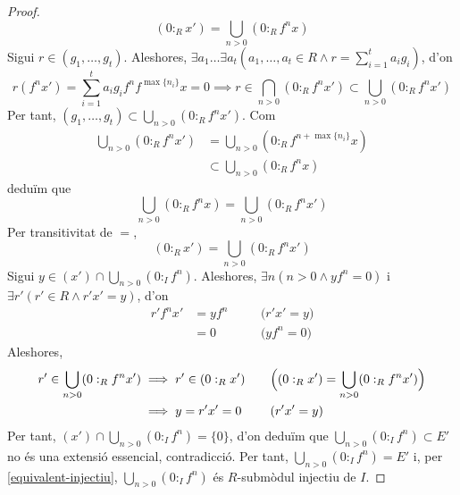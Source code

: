 \begin{lema}
\begin{enumerate}
\begin{proof}
\begin{equation*}
                (0:_{R}x')
                =\bigcup_{n>0}(0:_{R}f^{n}x)
            \end{equation*}
            Sigui $r\in(g_{1},\ldots,g_{t})$. Aleshores, $\exists a_{1}\ldots\exists a_{t}(a_{1},\ldots,a_{t}\in R\land r=\sum_{i=1}^{t}a_{i}g_{i})$, d'on
            \begin{equation*}
                r(f^{n}x')=\sum_{i=1}^{t}a_{i}g_{i}f^{n}f^{\max\{n_{i}\}}x=0
                \implies
                r\in\bigcap_{n>0}(0:_{R}f^{n}x')\subset\bigcup_{n>0}(0:_{R}f^{n}x')
            \end{equation*}
            Per tant, $(g_{1},\ldots,g_{t})\subset\bigcup_{n>0}(0:_{R}f^{n}x')$. Com
            \begin{align*}
                \bigcup_{n>0}(0:_{R}f^{n}x')
                &=\bigcup_{n>0}(0:_{R}f^{n+\max\{n_{i}\}}x)\\
                &\subset\bigcup_{n>0}(0:_{R}f^{n}x)
            \end{align*}
            deduïm que
            \begin{equation*}
                \bigcup_{n>0}(0:_{R}f^{n}x)
                =\bigcup_{n>0}(0:_{R}f^{n}x')
            \end{equation*}
            Per transitivitat de $=$,
            \begin{equation*}
                (0:_{R}x')
                =\bigcup_{n>0}(0:_{R}f^{n}x')
            \end{equation*}
            Sigui $y\in(x')\cap\bigcup_{n>0}(0:_{I}f^{n})$. Aleshores, $\exists n(n>0\land yf^{n}=0)$ i $\exists r'(r'\in R\land r'x'=y)$, d'on
            \begin{align*}
                r'f^{n}x'
                &=yf^{n}
                &\quad&\textrm{($r'x'=y$)}\\
                &=0
                &\quad&\textrm{($yf^{n}=0$)}
            \end{align*}
            Aleshores,
            \begin{align*}
                r'\in\bigcup_{n>0}(0:_{R}f^{n}x')
                &\implies
                r'\in(0:_{R}x')
                &\quad&\textrm{\Big($(0:_{R}x')
                =\bigcup_{n>0}(0:_{R}f^{n}x')$\Big)}\\
                &\implies
                y=r'x'=0
                &\quad&\textrm{($r'x'=y$)}
            \end{align*}
            Per tant, $(x')\cap\bigcup_{n>0}(0:_{I}f^{n})=\{0\}$, d'on deduïm que $\bigcup_{n>0}(0:_{I}f^{n})\subset E'$ no és una extensió essencial, contradicció. Per tant, $\bigcup_{n>0}(0:_{I}f^{n})=E'$ i, per \ref{equivalent-injectiu}, $\bigcup_{n>0}(0:_{I}f^{n})$ és $R$-submòdul injectiu de $I$.

\end{proof}
\end{enumerate}
\end{lema}
